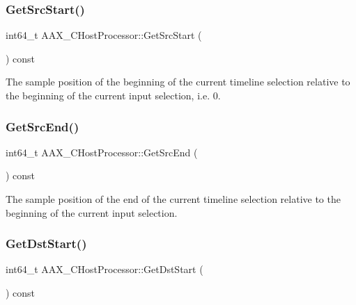 \subsubsection{\texorpdfstring{GetSrcStart()}{GetSrcStart()}}
{\footnotesize\ttfamily int64\+\_\+t A\+A\+X\+\_\+\+C\+Host\+Processor\+::\+Get\+Src\+Start (\begin{DoxyParamCaption}{ }\end{DoxyParamCaption}) const\hspace{0.3cm}{\ttfamily [inline]}}



The sample position of the beginning of the current timeline selection relative to the beginning of the current input selection, i.\+e. 0. 

\mbox{\label{a01485_a455276e8b5eb54b8547e7e20fc9b19b8}} 
\subsubsection{\texorpdfstring{GetSrcEnd()}{GetSrcEnd()}}
{\footnotesize\ttfamily int64\+\_\+t A\+A\+X\+\_\+\+C\+Host\+Processor\+::\+Get\+Src\+End (\begin{DoxyParamCaption}{ }\end{DoxyParamCaption}) const\hspace{0.3cm}{\ttfamily [inline]}}



The sample position of the end of the current timeline selection relative to the beginning of the current input selection. 

\mbox{\label{a01485_adaec35b42e103cf06f14b1b3e60cb47e}} 
\subsubsection{\texorpdfstring{GetDstStart()}{GetDstStart()}}
{\footnotesize\ttfamily int64\+\_\+t A\+A\+X\+\_\+\+C\+Host\+Processor\+::\+Get\+Dst\+Start (\begin{DoxyParamCaption}{ }\end{DoxyParamCaption}) const\hspace{0.3cm}{\ttfamily [inline]}}



